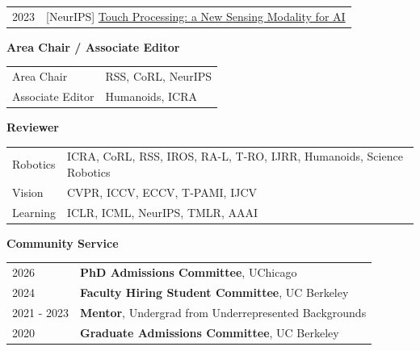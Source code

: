 \documentclass{resume}
\begin{document}
{\renewcommand{\arraystretch}{1.1}
\begin{tabular}{@{}L{2.1cm}l@{}}
{2023} & {[NeurIPS] \href{https://www.touchprocessing.org/2023/}{Touch Processing: a New Sensing Modality for AI}}
\end{tabular}}

{\bf Area Chair / Associate Editor}

{\renewcommand{\arraystretch}{1.1}
\begin{tabular}{@{}L{2.1cm}l@{}}
{Area Chair} & {RSS, CoRL, NeurIPS} \\
{Associate Editor} & {Humanoids, ICRA}
\end{tabular}}

{\bf Reviewer}

{\renewcommand{\arraystretch}{1.1}
\begin{tabular}{@{}L{2.1cm}l@{}}
{Robotics} & {ICRA, CoRL, RSS, IROS, RA-L, T-RO, IJRR, Humanoids, Science Robotics} \\
{Vision} & {CVPR, ICCV, ECCV, T-PAMI, IJCV} \\
{Learning} & {ICLR, ICML, NeurIPS, TMLR, AAAI}
\end{tabular}}

{\bf Community Service}

{\renewcommand{\arraystretch}{1.1}
\begin{tabular}{@{}L{2.1cm}l@{}}
{2026} & \textbf{PhD Admissions Committee}, UChicago \\
{2024} & \textbf{Faculty Hiring Student Committee}, UC Berkeley \\
{2021 - 2023} & {\textbf{Mentor}, Undergrad from Underrepresented Backgrounds} \\
{2020} & {\textbf{Graduate Admissions Committee}, UC Berkeley}

\end{tabular}}
\end{document}
